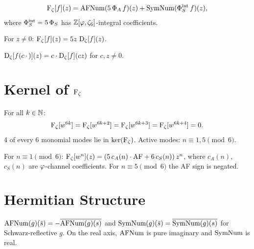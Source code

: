 \begin{definition}[$\Fz$ operator]
\label{def:fz}
\[
  \operatorname{F_\zeta}[f](z) = \operatorname{AFNum}(5\,\Phi_A\,f)(z) + \operatorname{SymNum}(\Phi_S^{\mathrm{int}}\,f)(z),
\]
where $\Phi_S^{\mathrm{int}} = 5\,\Phi_S$ has $\mathbb{Z}[\varphi,\zeta_6]$-integral coefficients.
\end{definition}

\begin{theorem}
\label{thm:fz-eq}
For $z\ne0$: $\operatorname{F_\zeta}[f](z) = 5z\,\operatorname{D_\zeta}[f](z)$.
\end{theorem}

\begin{theorem}
\label{thm:gauge-covariance}
$\operatorname{D_\zeta}[f(c\,\cdot\,)](z) = c\cdot\operatorname{D_\zeta}[f](cz)$ for $c,z\ne 0$.
\end{theorem}

\section{\texorpdfstring{Kernel of $\Fz$}{Kernel of Fζ}}

\begin{theorem}
\label{thm:kernel-mod6}
For all $k\in\mathbb{N}$:
\[
  \operatorname{F_\zeta}[w^{6k}] = \operatorname{F_\zeta}[w^{6k+2}] = \operatorname{F_\zeta}[w^{6k+3}] = \operatorname{F_\zeta}[w^{6k+4}] = 0.
\]
4 of every 6 monomial modes lie in $\ker(\operatorname{F_\zeta})$.
Active modes: $n\equiv 1,5\pmod6$.
\end{theorem}

\begin{theorem}
\label{thm:eigenvalue}
For $n\equiv1\pmod6$:
$\operatorname{F_\zeta}[w^n](z) = (5\,c_A(n)\cdot\mathrm{AF} + 6\,c_S(n))\,z^n$,
where $c_A(n)$, $c_S(n)$ are $\varphi$-channel coefficients.
For $n\equiv5\pmod6$ the AF sign is negated.
\end{theorem}

\section{Hermitian Structure}

\begin{theorem}
\label{thm:hermitian}
$\operatorname{AFNum}(g)(\bar s) = -\overline{\operatorname{AFNum}(g)(s)}$ and
$\operatorname{SymNum}(g)(\bar s) = \overline{\operatorname{SymNum}(g)(s)}$
for Schwarz-reflective $g$.
On the real axis, $\operatorname{AFNum}$ is pure imaginary and $\operatorname{SymNum}$ is real.
\end{theorem}

